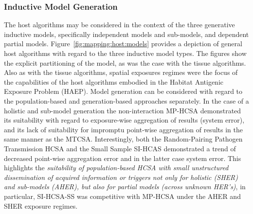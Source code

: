\subsubsection{Inductive Model Generation}
The host algorithms may be considered in the context of the three generative inductive models, specifically independent models and sub-models, and dependent partial models.
Figure~\ref{fig:mapping:host:models} provides a depiction of general host algorithms with regard to the three inductive model types. The figures show the explicit partitioning of the model, as was the case with the tissue algorithms.
Also as with the tissue algorithms, spatial exposures regimes were the focus of the capabilities of the host algorithms embodied in the Habitat Antigenic Exposure Problem (HAEP). Model generation can be considered with regard to the population-based and generation-based approaches separately. 
In the case of a holistic and sub-model generation the non-interaction MP-HCSA demonstrated its suitability with regard to exposure-wise aggregation of results (system error), and its lack of suitability for impromptu point-wise aggregation of results in the same manner as the MTCSA. Interestingly, both the Random-Pairing Pathogen Transmission HCSA and the Small Sample SI-HCAS demonstrated a trend of decreased point-wise aggregation error and in the latter case system error. This highlights the \emph{suitability of population-based HCSA with small unstructured dissemination of acquired information or triggers not only for holistic (SHER) and sub-models (AHER), but also for partial models (across unknown HER's)}, in particular, SI-HCSA-SS was competitive with MP-HCSA under the AHER and SHER exposure regimes.

